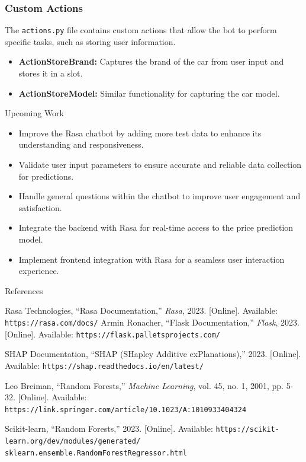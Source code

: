 \documentclass{beamer}
\begin{document}
\begin{frame}
\frametitle{Custom Actions}
The \texttt{actions.py} file contains custom actions that allow the bot to perform specific tasks, such as storing user information.
\begin{itemize}
    \item \textbf{ActionStoreBrand:} Captures the brand of the car from user input and stores it in a slot.
    \item \textbf{ActionStoreModel:} Similar functionality for capturing the car model.
\end{itemize}
\end{frame}

\begin{frame}{Upcoming Work}
    \begin{itemize}
        \item Improve the Rasa chatbot by adding more test data to enhance its understanding and responsiveness.
        \item Validate user input parameters to ensure accurate and reliable data collection for predictions.
        \item Handle general questions within the chatbot to improve user engagement and satisfaction.
        \item Integrate the backend with Rasa for real-time access to the price prediction model.
        \item Implement frontend integration with Rasa for a seamless user interaction experience.
    \end{itemize}
\end{frame}


\begin{frame}[t]{References}
\begin{thebibliography}{9}

Rasa Technologies, ``Rasa Documentation,'' \textit{Rasa}, 2023. [Online]. Available: \texttt{https://rasa.com/docs/}
Armin Ronacher, ``Flask Documentation,'' \textit{Flask}, 2023. [Online]. Available: \texttt{https://flask.palletsprojects.com/}


SHAP Documentation, ``SHAP (SHapley Additive exPlanations),'' 2023. [Online]. Available: \texttt{https://shap.readthedocs.io/en/latest/}

Leo Breiman, ``Random Forests,'' \textit{Machine Learning}, vol. 45, no. 1, 2001, pp. 5-32. [Online]. Available: \texttt{https://link.springer.com/article/10.1023/A:1010933404324}

Scikit-learn, ``Random Forests,'' 2023. [Online]. Available: \texttt{https://scikit-learn.org/dev/modules/generated/\\sklearn.ensemble.RandomForestRegressor.html}



\end{thebibliography}
\end{frame}
\end{document}
